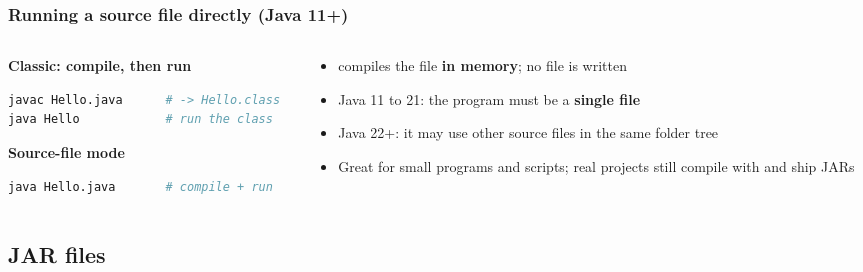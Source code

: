 \documentclass[aspectratio=169,10pt,compress]{beamer}
\begin{document}
\begin{frame}[t,fragile] \frametitle{Running a source file directly (Java 11+)}
  \begin{columns}[T]
    \begin{column}{0.5\textwidth}
      \textbf{Classic: compile, then run}


\begin{lstlisting}[style=codesnippet, language=bash]
javac Hello.java      # -> Hello.class
java Hello            # run the class
\end{lstlisting}


      \textbf{Source-file mode}


\begin{lstlisting}[style=codesnippet, language=bash]
java Hello.java       # compile + run
\end{lstlisting}


    \end{column}
    \begin{column}{0.46\textwidth}
      \begin{itemize}\small
        \item {} compiles the file \textbf{in memory}; no  file is written
        \item Java 11 to 21: the program must be a \textbf{single file}
        \item Java 22+: it may use other source files in the same folder tree
        \item Great for small programs and scripts; real projects still compile with  and ship JARs
      \end{itemize}
    \end{column}
  \end{columns}
\end{frame}




\subsection[JAR]{JAR files}
\end{document}
